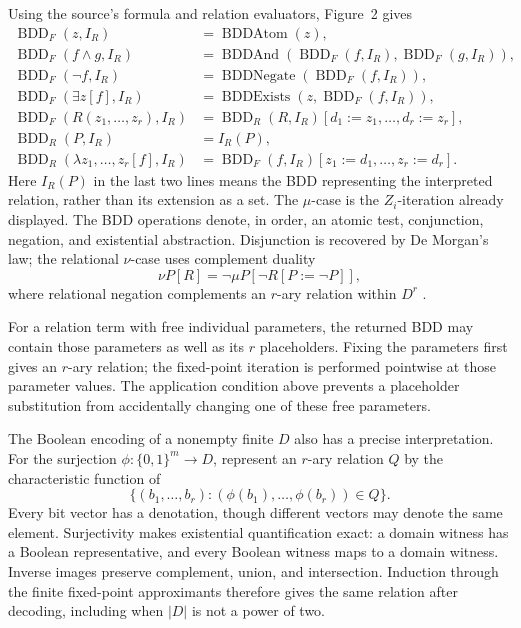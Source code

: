 Using the source's formula and relation evaluators, Figure~2 gives
\[
\begin{aligned}
 \operatorname{BDD}_F(z,I_R)
   &=\operatorname{BDDAtom}(z),\\
 \operatorname{BDD}_F(f\land g,I_R)
   &=\operatorname{BDDAnd}
       (\operatorname{BDD}_F(f,I_R),\operatorname{BDD}_F(g,I_R)),\\
 \operatorname{BDD}_F(\neg f,I_R)
   &=\operatorname{BDDNegate}(\operatorname{BDD}_F(f,I_R)),\\
 \operatorname{BDD}_F(\exists z[f],I_R)
   &=\operatorname{BDDExists}(z,\operatorname{BDD}_F(f,I_R)),\\
 \operatorname{BDD}_F(R(z_1,\ldots,z_r),I_R)
   &=\operatorname{BDD}_R(R,I_R)
           [d_1:=z_1,\ldots,d_r:=z_r],\\
 \operatorname{BDD}_R(P,I_R)&=I_R(P),\\
 \operatorname{BDD}_R(\lambda z_1,\ldots,z_r[f],I_R)
   &=\operatorname{BDD}_F(f,I_R)
           [z_1:=d_1,\ldots,z_r:=d_r].
\end{aligned}
\]
Here \(I_R(P)\) in the last two lines means the BDD representing the
interpreted relation, rather than its extension as a set. The \(\mu\)-case is
the \(Z_i\)-iteration already displayed. The BDD operations denote, in order,
an atomic test, conjunction, negation, and existential abstraction.
Disjunction is recovered by De Morgan's law; the relational \(\nu\)-case
uses complement duality
\[
 \nu P[R]=\neg\mu P[\neg R[P:=\neg P]],
\]
where relational negation complements an \(r\)-ary relation within \(D^r\)
\cite[\S\S3--4 and fig.~2]{BurchEtAl1992}.

For a relation term with free individual parameters, the returned BDD may
contain those parameters as well as its \(r\) placeholders. Fixing the
parameters first gives an \(r\)-ary relation; the fixed-point iteration is
performed pointwise at those parameter values. The application condition
above prevents a placeholder substitution from accidentally changing one of
these free parameters.

The Boolean encoding of a nonempty finite \(D\) also has a precise
interpretation. For the surjection \(\phi:\{0,1\}^m\to D\), represent an
\(r\)-ary relation \(Q\) by the characteristic function of
\[
 \{(b_1,\ldots,b_r):(\phi(b_1),\ldots,\phi(b_r))\in Q\}.
\]
Every bit vector has a denotation, though different vectors may denote the
same element. Surjectivity makes existential quantification exact: a domain
witness has a Boolean representative, and every Boolean witness maps to a
domain witness. Inverse images preserve complement, union, and intersection.
Induction through the finite fixed-point approximants therefore gives the
same relation after decoding, including when \(|D|\) is not a power of two.

